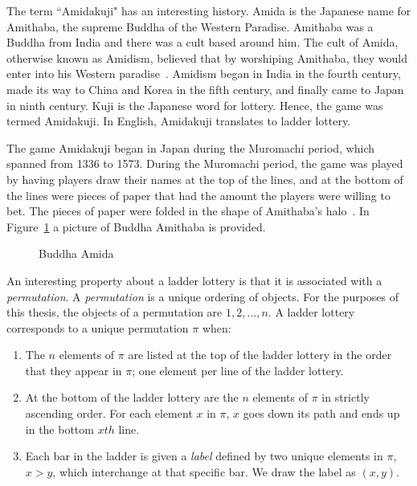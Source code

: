 The term ``Amidakuji" has an interesting history. Amida is the Japanese name 
for Amithaba, the supreme Buddha of the Western Paradise. Amithaba
was a Buddha from India and there was a cult based around him. The cult 
of Amida, otherwise known as Amidism, believed that by worshiping Amithaba, they would 
enter into his Western paradise~\cite{A0}. Amidism began in India in the fourth century,
made its way to China and Korea in the fifth century, and finally came 
to Japan in ninth century. Kuji is the Japanese word for lottery. Hence, the game 
was termed Amidakuji. In English, Amidakuji translates to ladder lottery.\par 
The game Amidakuji began in Japan during 
the Muromachi period, which spanned from
1336 to 1573. During the Muromachi period, the game was played by having
players draw their names at the top of the lines, and at the bottom 
of the lines were pieces of paper that had the amount the players
were willing to bet. The pieces of paper were folded in the shape of 
Amithaba's halo~\cite{A0}. In Figure~\ref{Fig:Amida} a picture of Buddha Amithaba is provided.
\begin{figure}[ht]
	\centering 
	\caption{Buddha Amida}
	\label{Fig:Amida}
\end{figure}

An interesting property about a ladder lottery is that it is  
associated with a \emph{permutation}. A \emph{permutation} is a unique ordering of objects. 
For the purposes of this thesis, the objects of a permutation are $1,2, \dots ,n$. 
A ladder lottery corresponds to a unique permutation $\pi$ when:
\begin{enumerate}
	\item The $n$ elements of $\pi$ are listed at the top of the ladder lottery in the order that they appear in 
	$\pi$; one element per line of the ladder lottery.
	\item At the bottom of the ladder lottery are the $n$ elements of $\pi$ in strictly ascending order. For 
	each element $x$ in $\pi$, $x$ goes down its path and ends up in the bottom $xth$ line.
	\item Each bar in the ladder is given a \emph{label} defined by two unique elements in $\pi$, $x>y$, which interchange at that specific bar. We draw 
	the label as $(x,y)$. 
\end{enumerate} 


